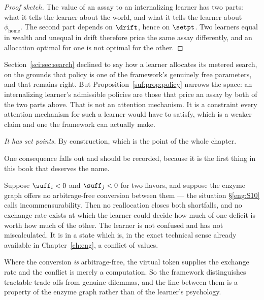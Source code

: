 \begin{proof}[Proof sketch]
The value of an assay to an internalizing learner has two parts: what it
tells the learner about the world, and what it tells the learner about
$\phi_{\mathrm{home}}$.
The second part depends on $\drift$, hence on $\setpt$.
Two learners equal in wealth and unequal in drift therefore price the
same assay differently, and an allocation optimal for one is not optimal
for the other.
\end{proof}

\begin{remark}
\label{suf:rem:attention}
Section~\ref{sci:sec:search} declined to say how a learner allocates its
metered search, on the grounds that policy is one of the framework's
genuinely free parameters, and that remains right.
But Proposition~\ref{suf:prop:policy} narrows the space: an internalizing
learner's admissible policies are those that price an assay by both of
the two parts above.
That is not an attention mechanism.
It is a constraint every attention mechanism for such a learner would
have to satisfy, which is a weaker claim and one the framework can
actually make.
\end{remark}

\emph{It has set points.}
By construction, which is the point of the whole chapter.

\begin{remark}
\label{suf:rem:conflict}
One consequence falls out and should be recorded, because it is the
first thing in this book that deserves the name.

Suppose $\suff_i < 0$ and $\suff_j < 0$ for two flavors, and suppose the
enzyme graph offers no arbitrage-free conversion between them --- the
situation \S\ref{eng:S10} calls incommensurability.
Then no reallocation closes both shortfalls, and no exchange rate exists
at which the learner could decide how much of one deficit is worth how
much of the other.
The learner is not confused and has not miscalculated.
It is in a state which is, in the exact technical sense already available
in Chapter~\ref{ch:eng}, a conflict of values.

Where the conversion \emph{is} arbitrage-free, the virtual token supplies
the exchange rate and the conflict is merely a computation.
So the framework distinguishes tractable trade-offs from genuine
dilemmas, and the line between them is a property of the enzyme graph
rather than of the learner's psychology.
\end{remark}

